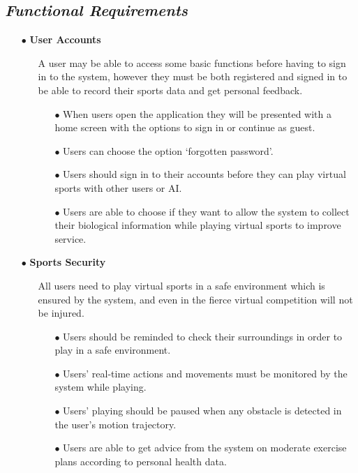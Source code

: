 \documentclass[a4paper]{article}
\begin{document}
	\subsection{\textsl{Functional Requirements}}
	\begin{itemize}
		\item[$\bullet$] {\large\textbf{User Accounts}}
		\begin{itemize}
			\item[] A user may be able to access some basic functions before having to sign in to the system, however they must be both registered and signed in to be able to record their sports data and get personal feedback.
			\begin{itemize}
				\item[$\bullet$] When users open the application they will be presented with a home screen with the options to sign in or continue as guest.
				\item[$\bullet$] Users can choose the option `forgotten password'.
				\item[$\bullet$] Users should sign in to their accounts before they can play virtual sports with other users or AI.
				\item[$\bullet$] Users are able to choose if they want to allow the system to collect their biological information while playing virtual sports to improve service.				
			\end{itemize}
		\end{itemize}
		\item[$\bullet$] {\large\textbf{Sports Security}}
		\begin{itemize}
			\item[] All users need to play virtual sports in a safe environment which is ensured by the system, and even in the fierce virtual competition will not be injured.
			\begin{itemize}
				\item[$\bullet$] Users should be reminded to check their surroundings in order to play in a safe environment.
				\item[$\bullet$] Users' real-time actions and movements must be monitored by the system while playing.
				\item[$\bullet$] Users' playing should be paused when any obstacle is detected in the user's motion trajectory.
				\item[$\bullet$] Users are able to get advice from the system on moderate exercise plans according to personal health data.				
			\end{itemize}

\end{itemize}
\end{itemize}
\end{document}
